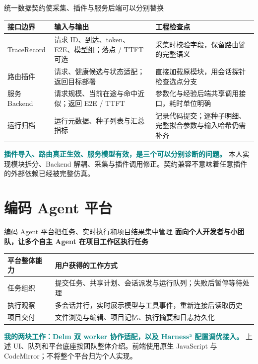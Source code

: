 \documentclass[aspectratio=169,10pt]{beamer}
\newcommand{\src}[1]{\vfill{\fontsize{6.7}{8}\selectfont\color{Muted}#1}\par}
\newcommand{\lead}[1]{{\color{Teal}\large\bfseries #1}\par\medskip}
\newcommand{\term}[1]{\textcolor{Teal}{\textbf{#1}}}
\begin{document}
\begin{frame}{统一数据契约使采集、插件与服务后端可以分别替换}
\renewcommand{\arraystretch}{1.55}
\begin{tabularx}{\textwidth}{@{}p{2.6cm}YY@{}}
\toprule 接口边界 & 输入与输出 & 工程检查点 \\
\midrule
TraceRecord & 请求 ID、到达、token、E2E、模型组；落点 / TTFT 可选 & 采集时校验字段，保留路由键的完整语义 \\
路由插件 & 请求、健康候选与状态适配；返回目标部署 & 直接加载原模块，用会话探针检查选点分支 \\
服务 Backend & 请求规模、当前在途与命中近似；返回 E2E / TTFT & 参数化与经验后端共享调用接口，耗时单位明确 \\
运行归档 & 运行元数据、种子列表与汇总指标 & 记录代码提交；逐种子明细、完整拟合参数与输入哈希仍需补齐 \\
\bottomrule
\end{tabularx}
\medskip
\term{插件导入、路由真正生效、服务模型有效，是三个可以分别诊断的问题。}
\src{本人实现模块拆分、Backend 解耦、采集与插件调用修正。契约兼容不意味着任意插件的外部依赖已经被完整仿真。}
\end{frame}

\section{编码 Agent 平台}
\begin{frame}{编码 Agent 平台把任务、实时执行和项目结果集中管理}
\lead{面向个人开发者与小团队，让多个自主 Agent 在项目工作区执行任务}
\renewcommand{\arraystretch}{1.65}
\begin{tabularx}{\textwidth}{@{}p{2.8cm}Y@{}}
\toprule 平台整体能力 & 用户获得的工作方式 \\
\midrule
任务组织 & 提交任务、共享计划、会话派发与运行队列；失败后暂停等待处理 \\
执行观察 & 多会话并行，实时展示模型与工具事件，重新连接后读取历史 \\
项目交付 & 文件浏览与编辑、项目记忆、执行摘要和日志持久化 \\
\bottomrule
\end{tabularx}
\medskip
\term{我的两块工作：Delm 双 worker 协作适配，以及 Harness² 配置调优接入。}
\src{上述 UI、队列和平台底座按团队整体介绍。前端使用原生 JavaScript 与 CodeMirror；不将整个平台归为个人实现。}
\end{frame}
\end{document}
